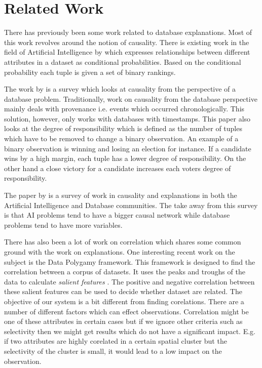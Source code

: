 \section{Related Work}
There has previously been some work related to database explanations. Most of this work revolves around the notion of causality. There is existing work in the field of Artificial Intelligence by \cite{zhang2002discovering} which expresses relationships between different attributes in a dataset as conditional probabilities. Based on the conditional probability each tuple is given a set of binary rankings.

The work by \cite{meliou2010causality} is a survey which looks at causality from the perspective of a database problem. Traditionally, work on causality from the database perspective mainly deals with provenance i.e. events which occurred chronologically. This solution, however, only works with databases with timestamps. This paper also looks at the degree of responsibility which is defined as the number of tuples which have to be removed to change a binary observation. An example of a binary observation is winning and losing an election for instance. If a candidate wins by a high margin, each tuple has a lower degree of responsibility. On the other hand a close victory for a candidate increases each voters degree of responsibility.

The paper by \cite{meliou2014causality} is a survey of work in causality and explanations in both the Artificial Intelligence and Database communities. The take away from this survey is that AI problems tend to have a bigger causal network while database problems tend to have more variables.

There has also been a lot of work on correlation which shares some common ground with the work on explanations. One interesting recent work on the subject is the Data Polygamy framework\citep{chirigati2016data}. This framework is designed to find the correlation between a corpus of datasets. It uses the peaks and troughs of the data to calculate \textit{salient features} \citep{dunn1986applied}. The positive and negative correlation between these salient features can be used to decide whether dataset are related\citep{su2014supporting}. The objective of our system is a bit different from finding corelations. There are a number of different factors which can effect observations. Correlation might be one of these attributes in certain cases but if we ignore other criteria such as selectivity then we might get results which do not have a significant impact. E.g. if two attributes are highly corelated in a certain spatial cluster but the selectivity of the cluster is small, it would lead to a low impact on the observation.

